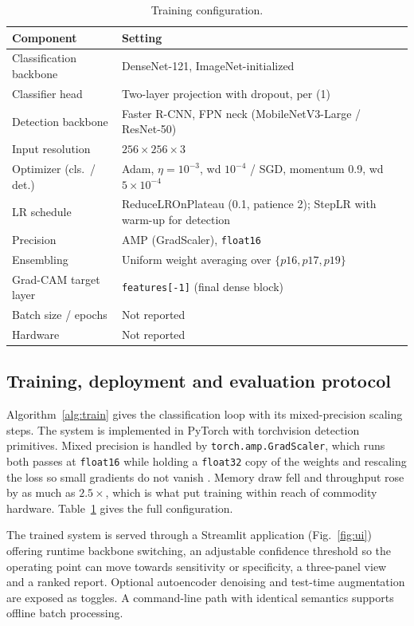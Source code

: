 \documentclass[conference]{IEEEtran}
\begin{document}
\begin{table}[!t]
\caption{Training configuration.}
\label{tab:config}
\centering
\footnotesize
\begin{tabular}{@{}p{2.6cm}p{5.0cm}@{}}
\toprule
Component & Setting \\
\midrule
Classification backbone & DenseNet-121, ImageNet-initialized \\
Classifier head & Two-layer projection with dropout, per (1) \\
Detection backbone & Faster R-CNN, FPN neck (MobileNetV3-Large / ResNet-50) \\
Input resolution & $256 \times 256 \times 3$ \\
Optimizer (cls.\ / det.) & Adam, $\eta = 10^{-3}$, wd $10^{-4}$ / SGD, momentum 0.9, wd $5 \times 10^{-4}$ \\
LR schedule & ReduceLROnPlateau (0.1, patience 2); StepLR with warm-up for detection \\
Precision & AMP (GradScaler), \texttt{float16} \\
Ensembling & Uniform weight averaging over $\{p16, p17, p19\}$ \\
Grad-CAM target layer & \texttt{features[-1]} (final dense block) \\
Batch size / epochs & Not reported \\
Hardware & Not reported \\
\bottomrule
\end{tabular}
\end{table}

\subsection{Training, deployment and evaluation protocol}

Algorithm~\ref{alg:train} gives the classification loop with its
mixed-precision scaling steps. The system is implemented in PyTorch with
torchvision detection primitives. Mixed precision is handled by
\texttt{torch.amp.GradScaler}, which runs both passes at \texttt{float16} while
holding a \texttt{float32} copy of the weights and rescaling the loss so small
gradients do not vanish \cite{micikevicius2018}. Memory draw fell and throughput
rose by as much as $2.5\times$, which is what put training within reach of
commodity hardware. Table~\ref{tab:config} gives the full configuration.

The trained system is served through a Streamlit application
(Fig.~\ref{fig:ui}) offering runtime backbone switching, an adjustable
confidence threshold so the operating point can move towards sensitivity or
specificity, a three-panel view and a ranked report. Optional
autoencoder denoising and test-time augmentation are exposed as toggles. A
command-line path with identical semantics supports offline batch processing.
\end{document}
